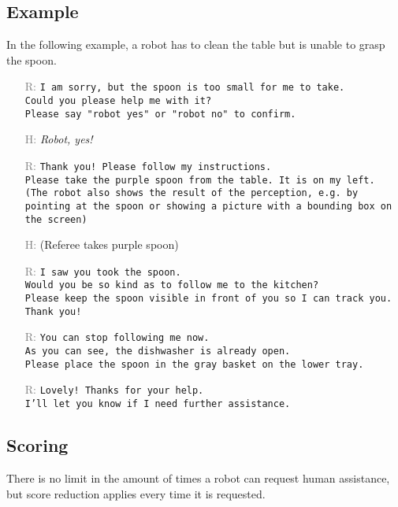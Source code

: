 \subsection*{Example}\label{rule:continue_example}
In the following example, a robot has to clean the table but is unable to grasp the spoon.
\begin{itemize}[noitemsep]
	\small
	\item[\textcolor{gray}{R:}] \texttt{I am sorry, but the spoon is too small for me to take.\\
	Could you please help me with it?\\
	Please say "robot yes" or "robot no" to confirm.}
	\item[\textcolor{gray}{H:}] \textit{Robot, yes!}
	\item[\textcolor{gray}{R:}] \texttt{Thank you! Please follow my instructions.\\
	Please take the purple spoon from the table. It is on my left. \\(The robot also shows the result of the perception, e.g. by pointing at the spoon or showing a picture with a bounding box on the screen)}
	\item[\textcolor{gray}{H:}] (Referee takes purple spoon)
	\item[\textcolor{gray}{R:}] \texttt{I saw you took the spoon.\\
	Would you be so kind as to follow me to the kitchen?\\
	Please keep the spoon visible in front of you so I can track you. Thank you!}
	\item[\textcolor{gray}{R:}] \texttt{You can stop following me now.\\
	As you can see, the dishwasher is already open.\\
	Please place the spoon in the gray basket on the lower tray.}
	\item[\textcolor{gray}{R:}] \texttt{Lovely! Thanks for your help.\\
	I'll let you know if I need further assistance.}
\end{itemize}


\subsection{Scoring}\label{rule:continue_scoring}
There is no limit in the amount of times a robot can request human assistance, but score reduction applies every time it is requested.

